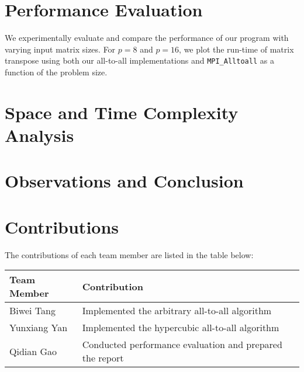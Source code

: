 \documentclass{article}
\begin{document}
\section{Performance Evaluation}
We experimentally evaluate and compare the performance of our program with varying input matrix sizes. For $p = 8$ and $p = 16$, we plot the run-time of matrix transpose using both our all-to-all implementations and \texttt{MPI\_Alltoall} as a function of the problem size.


\section{Space and Time Complexity Analysis}

\section{Observations and Conclusion}

\section{Contributions}
The contributions of each team member are listed in the table below:

\begin{table}[H]
\centering
\begin{tabular}{|l|l|}
\hline
\textbf{Team Member} & \textbf{Contribution} \\
\hline
Biwei Tang & Implemented the arbitrary all-to-all algorithm \\
\hline
Yunxiang Yan & Implemented the hypercubic all-to-all algorithm \\
\hline
Qidian Gao & Conducted performance evaluation and prepared the report \\
\hline
\end{tabular}
\end{table}
\end{document}
